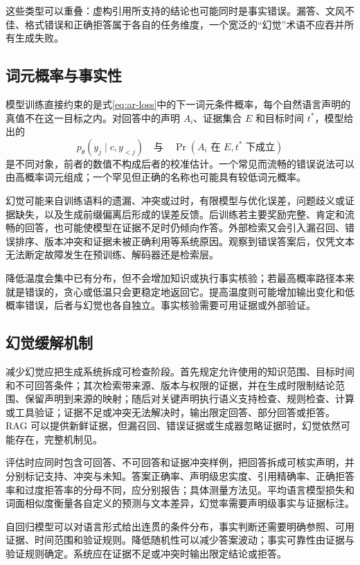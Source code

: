 \documentclass[../textbook.tex]{subfiles}
\begin{document}
这些类型可以重叠：虚构引用所支持的结论也可能同时是事实错误。漏答、文风不佳、格式错误和正确拒答属于各自的任务维度，一个宽泛的“幻觉”术语不应吞并所有生成失败。

\subsection{词元概率与事实性}
模型训练直接约束的是式\eqref{eq:ar-loss}中的下一词元条件概率，每个自然语言声明的真值不在这一目标之内。对回答中的声明 $A_i$、证据集合 $E$ 和目标时间 $t^*$，模型给出的
\begin{equation}
 p_\theta(y_j\mid c,y_{<j})
 \quad\text{与}\quad
 \Pr(A_i\text{ 在 }E,t^*\text{ 下成立})
\end{equation}
是不同对象，前者的数值不构成后者的校准估计。一个常见而流畅的错误说法可以由高概率词元组成；一个罕见但正确的名称也可能具有较低词元概率。

幻觉可能来自训练语料的遗漏、冲突或过时，有限模型与优化误差，问题歧义或证据缺失，以及生成前缀偏离后形成的误差反馈。后训练若主要奖励完整、肯定和流畅的回答，也可能使模型在证据不足时仍倾向作答。外部检索又会引入漏召回、错误排序、版本冲突和证据未被正确利用等系统原因。观察到错误答案后，仅凭文本无法断定故障发生在预训练、解码器还是检索层。

降低温度会集中已有分布，但不会增加知识或执行事实核验；若最高概率路径本来就是错误的，贪心或低温只会更稳定地返回它。提高温度则可能增加输出变化和低概率错误，后者与幻觉也各自独立。事实核验需要可用证据或外部验证。

\subsection{幻觉缓解机制}
减少幻觉应把生成系统拆成可检查阶段。首先规定允许使用的知识范围、目标时间和不可回答条件；其次检索带来源、版本与权限的证据，并在生成时限制结论范围、保留声明到来源的映射；随后对关键声明执行语义支持检查、规则检查、计算或工具验证；证据不足或冲突无法解决时，输出限定回答、部分回答或拒答。RAG 可以提供新鲜证据，但漏召回、错误证据或生成器忽略证据时，幻觉依然可能存在，完整机制见。

评估时应同时包含可回答、不可回答和证据冲突样例，把回答拆成可核实声明，并分别标记支持、冲突与未知。答案正确率、声明级忠实度、引用精确率、正确拒答率和过度拒答率的分母不同，应分别报告；具体测量方法见。平均语言模型损失和词面相似度衡量各自定义的预测与文本差异，幻觉率需要声明级事实与证据标注。

\begin{note}[生成连贯性与事实判断的边界]
自回归模型可以对语言形式给出连贯的条件分布，事实判断还需要明确参照、可用证据、时间范围和验证规则。降低随机性可以减少答案波动；事实可靠性由证据与验证规则确定。系统应在证据不足或冲突时输出限定结论或拒答。\end{note}
\end{document}
